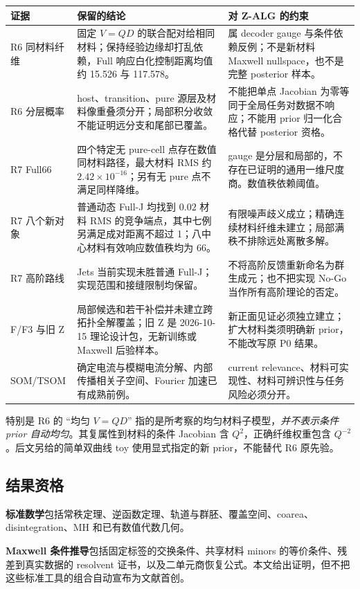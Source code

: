 \begin{longtable}{p{}p{}p{}}
\toprule
证据 & 保留的结论 & 对 Z-ALG 的约束\\\midrule\endhead
R6 同材料纤维 & 固定 $V=QD$ 的联合配对给相同材料；保持经验边缘却打乱依赖，Full 响应白化控制距离均值约 15.526 与 117.578。 & 属 decoder gauge 与条件依赖反例；不是新材料 Maxwell nullspace，也不是完整 posterior 样本。\\
R6 分层概率 & host、transition、pure 源层及材料像重叠须分开；局部积分收敛不能证明远分支和尾部已覆盖。 & 不能把单点 Jacobian 为零等同于全局任务对数据不响应；不能用 prior 归一化合格代替 posterior 资格。\\
R7 Full66 & 四个特定无 pure-cell 点存在数值同材料路径，最大材料 RMS 约 $2.42\times10^{-16}$；另有无 pure 点不满足同样降维。 & gauge 是分层和局部的，不存在已证明的通用一维尺度商。数值秩依赖阈值。\\
R7 八个新对象 & 普通动态 Full-J 均找到 $0.02$ 材料 RMS 的竞争端点，其中七例另满足成对距离不超过 1；八中心材料有效响应数值秩均为 66。 & 有限噪声歧义成立；精确连续材料纤维未建立；局部满秩不排除远处离散多解。\\
R7 高阶路线 & Jets 当前实现未胜普通 Full-J；实现范围和接缝限制均保留。 & 不将高阶反馈重新命名为群生成元；也不把实现 No-Go 当作所有高阶理论的否定。\\
F/F3 与旧 Z & 局部候选和若干补偿并未建立跨拓扑全解覆盖；旧 Z 是 2026-10-15 理论设计包，无新训练或 Maxwell 后验样本。 & 新正面见证必须独立建立；扩大材料类须明确新 prior，不能改写原 P0 结果。\\
SOM/TSOM & 确定电流与模糊电流分解、内部传播相关子空间、Fourier 加速已有成熟前例。 & current relevance、材料可实现性、材料可辨识性与任务风险必须分开。\\\bottomrule
\end{longtable}

特别是 R6 的 ``均匀 $V=QD$'' 指的是所考察的均匀材料子模型，\emph{并不表示条件 prior 自动均匀}。其复属性到材料的条件 Jacobian 含 $Q^2$，正确纤维权重包含 $Q^{-2}$。后文另给的简单双曲线 toy 使用显式指定的新 prior，不能替代 R6 原先验。

\subsection{结果资格}

\textbf{标准数学}包括常秩定理、逆函数定理、轨道与群胚、覆盖空间、coarea、disintegration、MH 和已有数值代数几何。

\textbf{Maxwell 条件推导}包括固定标签的交换条件、共享材料 minors 的等价条件、残差到真实数据的 resolvent 证书，以及二单元商恢复公式。本文给出证明，但不把这些标准工具的组合自动宣布为文献首创。

